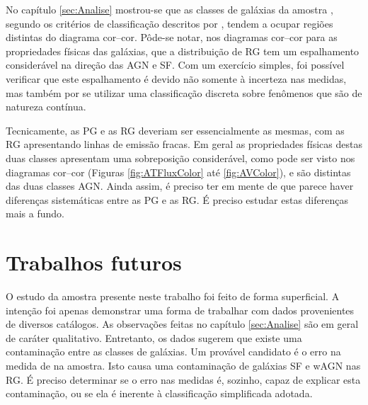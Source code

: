 No capítulo \ref{sec:Analise} mostrou-se que as classes de galáxias da amostra
\starlightUV, segundo os critérios de classificação descritos por
\citet{CidFernandes2011}, tendem a ocupar regiões distintas do diagrama
cor--cor. Pôde-se notar, nos diagramas cor--cor para as propriedades físicas das
galáxias, que a distribuição de RG tem um espalhamento considerável na direção
das AGN e SF. Com um exercício simples, foi possível verificar que este
espalhamento é devido não somente à incerteza nas medidas, mas também por se
utilizar uma classificação discreta sobre fenômenos que são de natureza
contínua.

Tecnicamente, as PG e as RG deveriam ser essencialmente as mesmas, com as RG
apresentando linhas de emissão fracas. Em geral as propriedades físicas destas
duas classes apresentam uma sobreposição considerável, como pode ser visto nos
diagramas cor--cor (Figuras \ref{fig:ATFluxColor} até \ref{fig:AVColor}), e são
distintas das duas classes AGN. Ainda assim, é preciso ter em mente de que
parece haver diferenças sistemáticas entre as PG e as RG. É preciso estudar
estas diferenças mais a fundo.



\section{Trabalhos futuros}

O estudo da amostra \starlightUV presente neste trabalho foi feito de forma
superficial. A intenção foi apenas demonstrar uma forma de trabalhar com dados
provenientes de diversos catálogos. As observações feitas no capítulo
\ref{sec:Analise} são em geral de caráter qualitativo. Entretanto, os dados
sugerem que existe uma contaminação entre as classes de galáxias. Um provável
candidato é o erro na medida de \WHa na amostra. Isto causa uma contaminação de
galáxias SF e wAGN nas RG. É preciso determinar se o erro nas medidas é,
sozinho, capaz de explicar esta contaminação, ou se ela é inerente à
classificação simplificada adotada.

